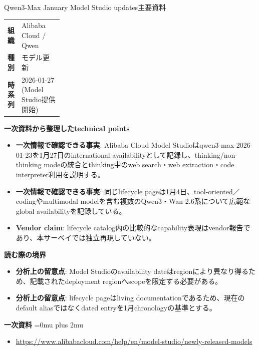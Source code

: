 \begin{technicalnote}{Qwen3-Max January Model Studio updates}{主要資料}
\begingroup
\begin{tabularx}{\linewidth}{@{}>{\bfseries}p{0.22\linewidth}X@{}}
組織 & Alibaba Cloud / Qwen \\
種別 & モデル更新 \\
時系列 & 2026-01-27 (Model Studio提供開始) \\
\end{tabularx}
\smallskip
{\bfseries 一次資料から整理したtechnical points}
\begin{itemize}[leftmargin=1.5em,itemsep=0.35em]
\item \textbf{一次情報で確認できる事実}: Alibaba Cloud Model Studioはqwen3-max-2026-01-23を1月27日のinternational availabilityとして記録し、thinking/non-thinking modeの統合とthinking中のweb search・web extraction・code interpreter利用を説明する。
\item \textbf{一次情報で確認できる事実}: 同じlifecycle pageは1月4日、tool-oriented／codingやmultimodal modelを含む複数のQwen3・Wan 2.6系について広範なglobal availabilityを記録している。
\item \textbf{Vendor claim}: lifecycle catalog内の比較的なcapability表現はvendor報告であり、本サーベイでは独立再現していない。
\end{itemize}
\begin{minipage}{\linewidth}
{\bfseries 読む際の境界}
\begin{itemize}[leftmargin=1.5em,itemsep=0.35em]
\item \textbf{分析上の留意点}: Model Studioのavailability dateはregionにより異なり得るため、記載されたdeployment regionへscopeを限定する必要がある。
\item \textbf{分析上の留意点}: lifecycle pageはliving documentationであるため、現在のdefault aliasではなくdated entryを1月chronologyの基準とする。
\end{itemize}
\begin{samepage}
{\bfseries 一次資料}
\begingroup\sloppy
\Urlmuskip=0mu plus 2mu\relax
\begin{itemize}[leftmargin=1.5em,itemsep=0.25em]
\item {\scriptsize\url{https://www.alibabacloud.com/help/en/model-studio/newly-released-models}}
\end{itemize}
\endgroup
\end{samepage}
\end{minipage}
\endgroup
\end{technicalnote}
\medskip

